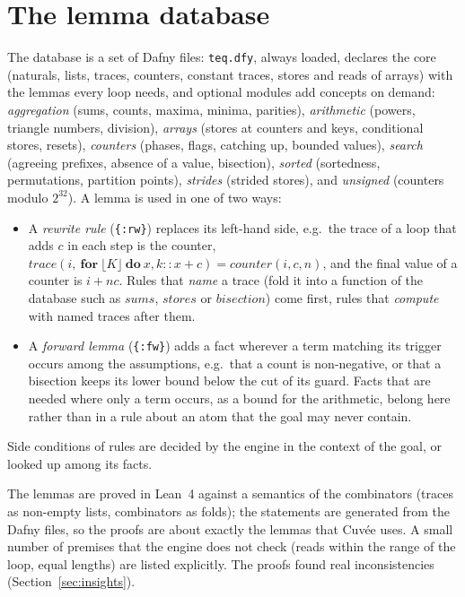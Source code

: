 \documentclass[a4paper,11pt]{article}
\newcommand{\cuvee}{Cuvée}
\newcommand{\tr}[1]{\lfloor #1\rfloor}
\begin{document}
\section{The lemma database}
\label{sec:database}

The database is a set of Dafny files: \texttt{teq.dfy}, always loaded, declares the core (naturals, lists, traces,
counters, constant traces, stores and reads of arrays) with the lemmas every loop needs, and optional modules add
concepts on demand: \emph{aggregation} (sums, counts, maxima, minima, parities), \emph{arithmetic} (powers, triangle
numbers, division), \emph{arrays} (stores at counters and keys, conditional stores, resets), \emph{counters} (phases,
flags, catching up, bounded values), \emph{search} (agreeing prefixes, absence of a value, bisection),
\emph{sorted} (sortedness, permutations, partition points), \emph{strides} (strided stores), and
\emph{unsigned} (counters modulo $2^{32}$). A lemma is used in one of two ways:
\begin{itemize}
\item A \emph{rewrite rule} (\texttt{\{:rw\}}) replaces its left-hand side, e.g.\ the trace of a loop that adds
  $c$ in each step is the counter, $\mathit{trace}(i,\ \textbf{for}\ \tr{K}\ \textbf{do}\ x, k :: x + c) =
  \mathit{counter}(i, c, n)$, and the final value of a counter is $i + n c$. Rules that \emph{name} a trace (fold it
  into a function of the database such as $\mathit{sums}$, $\mathit{stores}$ or $\mathit{bisection}$) come first,
  rules that \emph{compute} with named traces after them.
\item A \emph{forward lemma} (\texttt{\{:fw\}}) adds a fact wherever a term matching its trigger occurs among the
  assumptions, e.g.\ that a count is non-negative, or that a bisection keeps its lower bound below the cut of its
  guard. Facts that are needed where only a term occurs, as a bound for the arithmetic, belong here rather than in a
  rule about an atom that the goal may never contain.
\end{itemize}
Side conditions of rules are decided by the engine in the context of the goal, or looked up among its facts.

The lemmas are proved in Lean~4 against a semantics of the combinators (traces as non-empty lists, combinators as
folds); the statements are generated from the Dafny files, so the proofs are about exactly the lemmas that
\cuvee{} uses. A small number of premises that the engine does not check (reads within the range of the loop, equal
lengths) are listed explicitly. The proofs found real inconsistencies (Section~\ref{sec:insights}).
\end{document}
